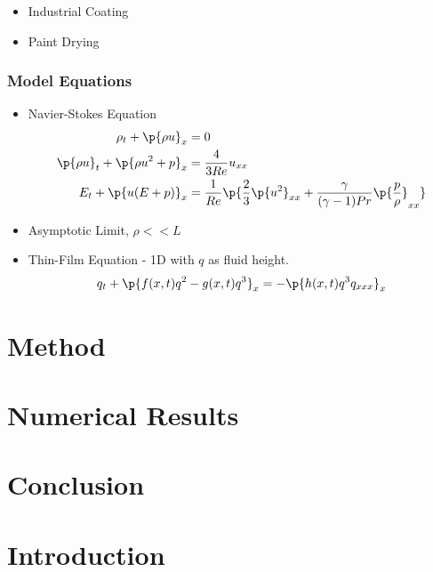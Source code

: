 \documentclass[10pt]{beamer}
\begin{document}
\begin{frame}
\begin{center}
      \end{center}
      \begin{itemize}
        \item Industrial Coating
        \item Paint Drying
      \end{itemize}
    \end{frame}

    \begin{frame}
      \frametitle{Model Equations}
      \begin{itemize}
        \item Navier-Stokes Equation
          \begin{align*}
            \rho_t + \p{\rho u}_x &= 0 \\
            \p{\rho u}_t + \p{\rho u^2 + p}_x &=  \frac{4}{3Re} u_{xx} \\
            E_t + \p{u (E + p)}_x &= \frac{1}{Re} \p{\frac{2}{3} \p{u^2}_{xx} + \frac{\gamma}{(\gamma - 1)Pr} \p{\frac{p}{\rho}}_{xx}}
          \end{align*}
        \item Asymptotic Limit, $\rho << L$
        \item Thin-Film Equation - 1D with $q$ as fluid height.
          \[
            q_t + \p{f(x, t) q^2 - g(x, t) q^3}_x = -\p{h(x, t) q^3 q_{xxx}}_x
          \]
      \end{itemize}
    \end{frame}

  \section{Method}
  \section{Numerical Results}
  \section{Conclusion}

  \section{Introduction}
\end{document}
